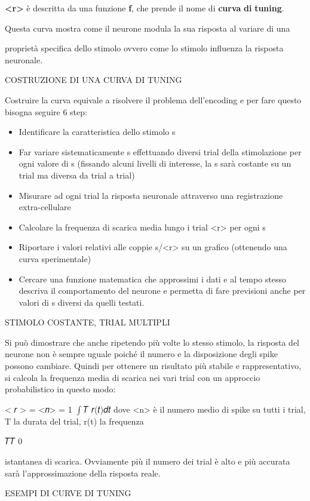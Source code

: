 \documentclass[12pt,a4paper]{book}
\begin{document}
\textbf{<r>}\textbf{ }è descritta da una funzione \textbf{f}, che prende il nome di \textbf{curva}\textbf{ }\textbf{di}\textbf{ }\textbf{tuning}.

Questa curva mostra come il neurone modula la sua risposta al variare di una

proprietà specifica dello stimolo ovvero come lo stimolo influenza la risposta neuronale.

COSTRUZIONE DI UNA CURVA DI TUNING

Costruire la curva equivale a risolvere il problema dell'encoding e per fare questo bisogna seguire 6 step:

\begin{itemize}
  \item Identificare la caratteristica dello stimolo s
  \item Far variare sistematicamente s effettuando diversi trial della stimolazione per ogni valore di s (fissando alcuni livelli di interesse, la s sarà costante su un trial ma diversa da trial a trial)
  \item Misurare ad ogni trial la risposta neuronale attraverso una registrazione extra-cellulare
  \item Calcolare la frequenza di scarica media lungo i trial <r> per ogni s
  \item Riportare i valori relativi alle coppie s/<r> su un grafico (ottenendo una curva sperimentale)
  \item Cercare una funzione matematica che approssimi i dati e al tempo stesso descriva il comportamento del neurone e permetta di fare previsioni anche per valori di s diversi da quelli testati.
\end{itemize}
STIMOLO COSTANTE, TRIAL MULTIPLI

Si può dimostrare che anche ripetendo più volte lo stesso stimolo, la risposta del neurone non è sempre uguale poiché il numero e la disposizione degli spike possono cambiare. Quindi per ottenere un risultato più stabile e rappresentativo, si calcola la frequenza media di scarica nei vari trial con un approccio probabilistico in questo modo:

< 𝑟 > = <𝑛> = 1 $\int$𝑇 𝑟(𝑡)𝑑𝑡 dove <n> è il numero medio di spike su tutti i trial, T la durata del trial, r(t) la frequenza

𝑇𝑇 0

istantanea di scarica. Ovviamente più il numero dei trial è alto e più accurata sarà l'approssimazione della risposta reale.

ESEMPI DI CURVE DI TUNING
\end{document}
